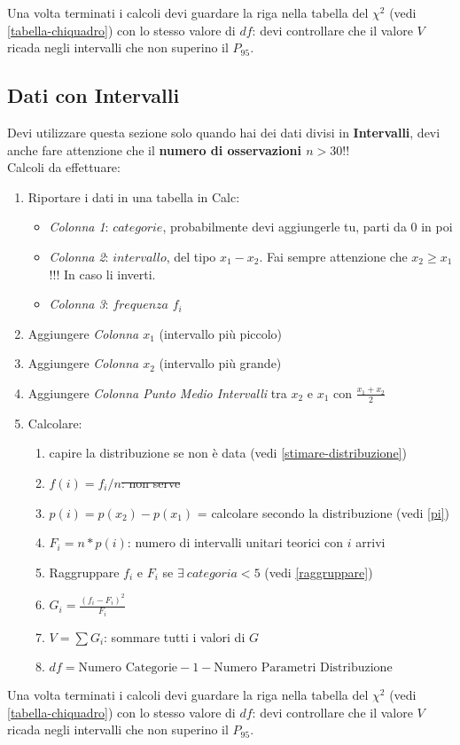 Una volta terminati i calcoli devi guardare la riga nella tabella del $\chi^2$
(vedi \ref{tabella-chiquadro}) con lo stesso valore di $df$: devi controllare che il valore
$V$ ricada negli intervalli che non superino il $P_{95}$.

\subsection{Dati con Intervalli}

Devi utilizzare questa sezione solo quando hai dei dati divisi in
\textbf{Intervalli}, devi anche fare attenzione che il \textbf{numero di
      osservazioni $n > 30$}!!\\

Calcoli da effettuare:

\begin{enumerate}
      \item Riportare i dati in una tabella in Calc:
            \begin{itemize}
                  \item \textit{Colonna 1}: $categorie$, probabilmente devi
                        aggiungerle tu, parti da 0 in poi
                  \item \textit{Colonna 2}: $intervallo$, del tipo $x_1 - x_2$.
                        Fai sempre attenzione che $x_2 \ge x_1$ !!! In caso li
                        inverti.
                  \item  \textit{Colonna 3}: $frequenza$ $f_i$
            \end{itemize}
      \item Aggiungere \textit{Colonna $x_1$} (intervallo più piccolo)
      \item Aggiungere \textit{Colonna $x_2$} (intervallo più grande)
      \item Aggiungere \textit{Colonna Punto Medio Intervalli} tra \textit{$x_2$} e
            \textit{$x_1$} con $\frac{x_1 + x_2}{2}$
      \item Calcolare:
            \begin{enumerate}
                  \item capire la distribuzione se non è data (vedi
                        \ref{stimare-distribuzione})
                  \item \st{$f(i) = f_i / n$: non serve}
                  \item $p(i) = p(x_2) - p(x_1)$ = calcolare secondo la distribuzione (vedi \ref{pi})
                  \item $F_i = n * p(i)$: numero di intervalli unitari teorici
                        con $i$ arrivi
                  \item Raggruppare $f_i$ e $F_i$ se $\exists \ categoria < 5$ (vedi \ref{raggruppare})
                  \item $G_i = \frac{(f_i - F_i)^2}{F_i}$
                  \item $V = \sum G_i$: sommare tutti i valori di $G$
                  \item $df = \text{Numero Categorie} - 1 - \text{Numero
                                    Parametri Distribuzione}$
            \end{enumerate}
\end{enumerate}

Una volta terminati i calcoli devi guardare la riga nella tabella del $\chi^2$
(vedi \ref{tabella-chiquadro}) con lo stesso valore di $df$: devi controllare che il valore
$V$ ricada negli intervalli che non superino il $P_{95}$.
